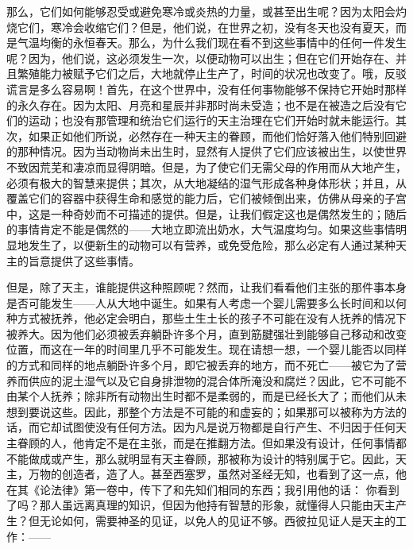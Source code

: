 \par

那么，它们如何能够忍受或避免寒冷或炎热的力量，或甚至出生呢？因为太阳会灼烧它们，寒冷会收缩它们？但是，他们说，在世界之初，没有冬天也没有夏天，而是气温均衡的永恒春天。那么，为什么我们现在看不到这些事情中的任何一件发生呢？因为，他们说，这必须发生一次，以便动物可以出生；但在它们开始存在、并且繁殖能力被赋予它们之后，大地就停止生产了，时间的状况也改变了。哦，反驳谎言是多么容易啊！首先，在这个世界中，没有任何事物能够不保持它开始时那样的永久存在。因为太阳、月亮和星辰并非那时尚未受造；也不是在被造之后没有它们的运动；也没有那管理和统治它们运行的天主治理在它们开始时就未能运行。其次，如果正如他们所说，必然存在一种天主的眷顾，而他们恰好落入他们特别回避的那种情况。因为当动物尚未出生时，显然有人提供了它们应该被出生，以使世界不致因荒芜和凄凉而显得阴暗。但是，为了使它们无需父母的作用而从大地产生，必须有极大的智慧来提供；其次，从大地凝结的湿气形成各种身体形状；并且，从覆盖它们的容器中获得生命和感觉的能力后，它们被倾倒出来，仿佛从母亲的子宫中，这是一种奇妙而不可描述的提供。但是，让我们假定这也是偶然发生的；随后的事情肯定不能是偶然的——大地立即流出奶水，大气温度均匀。如果这些事情明显地发生了，以便新生的动物可以有营养，或免受危险，那么必定有人通过某种天主的旨意提供了这些事情。\par

但是，除了天主，谁能提供这种照顾呢？然而，让我们看看他们主张的那件事本身是否可能发生——人从大地中诞生。如果有人考虑一个婴儿需要多么长时间和以何种方式被抚养，他必定会明白，那些土生土长的孩子不可能在没有人抚养的情况下被养大。因为他们必须被丢弃躺卧许多个月，直到筋腱强壮到能够自己移动和改变位置，而这在一年的时间里几乎不可能发生。现在请想一想，一个婴儿能否以同样的方式和同样的地点躺卧许多个月，即它被丢弃的地方，而不死亡——被它为了营养而供应的泥土湿气以及它自身排泄物的混合体所淹没和腐烂？因此，它不可能不由某个人抚养；除非所有动物出生时都不是柔弱的，而是已经长大了；而他们从未想到要说这些。因此，那整个方法是不可能的和虚妄的；如果那可以被称为方法的话，而它却试图使没有任何方法。因为凡是说万物都是自行产生、不归因于任何天主眷顾的人，他肯定不是在主张，而是在推翻方法。但如果没有设计，任何事情都不能做成或产生，那么就明显有天主眷顾，那被称为设计的特别属于它。因此，天主，万物的创造者，造了人。甚至西塞罗，虽然对圣经无知，也看到了这一点，他在其《论法律》第一卷中，传下了和先知们相同的东西；我引用他的话： 你看到了吗？那人虽远离真理的知识，但因为他持有智慧的形象，就懂得人只能由天主产生？但无论如何，需要神圣的见证，以免人的见证不够。西彼拉见证人是天主的工作：——\par

